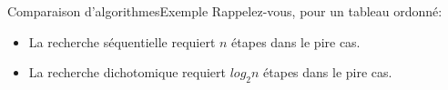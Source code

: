 \documentclass[12pt,a4paper]{beamer}
\begin{document}
\begin{frame}{Comparaison d'algorithmes}{Exemple}
Rappelez-vous, pour un tableau ordonné:
\begin{itemize}
\item La recherche séquentielle requiert $n$ étapes dans le pire cas.
\item La recherche dichotomique requiert  $log_2 n$ étapes dans le pire cas.
\end{itemize}



\end{frame}

%
%
%
%
%
%
%
%
%
%
%
%
%
%
\end{document}
